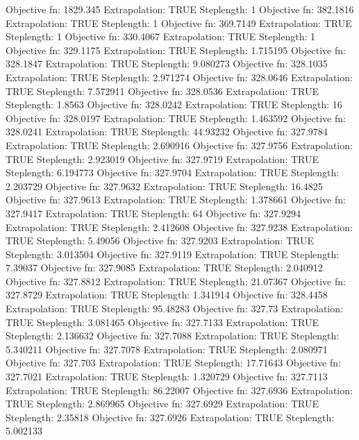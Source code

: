 \documentclass{article}
\begin{document}
\begin{Schunk}
\begin{Soutput}
Objective fn:  1829.345   Extrapolation:  TRUE   Steplength:  1 
Objective fn:  382.1816   Extrapolation:  TRUE   Steplength:  1 
Objective fn:  369.7149   Extrapolation:  TRUE   Steplength:  1 
Objective fn:  330.4067   Extrapolation:  TRUE   Steplength:  1 
Objective fn:  329.1175   Extrapolation:  TRUE   Steplength:  1.715195 
Objective fn:  328.1847   Extrapolation:  TRUE   Steplength:  9.080273 
Objective fn:  328.1035   Extrapolation:  TRUE   Steplength:  2.971274 
Objective fn:  328.0646   Extrapolation:  TRUE   Steplength:  7.572911 
Objective fn:  328.0536   Extrapolation:  TRUE   Steplength:  1.8563 
Objective fn:  328.0242   Extrapolation:  TRUE   Steplength:  16 
Objective fn:  328.0197   Extrapolation:  TRUE   Steplength:  1.463592 
Objective fn:  328.0241   Extrapolation:  TRUE   Steplength:  44.93232 
Objective fn:  327.9784   Extrapolation:  TRUE   Steplength:  2.690916 
Objective fn:  327.9756   Extrapolation:  TRUE   Steplength:  2.923019 
Objective fn:  327.9719   Extrapolation:  TRUE   Steplength:  6.194773 
Objective fn:  327.9704   Extrapolation:  TRUE   Steplength:  2.203729 
Objective fn:  327.9632   Extrapolation:  TRUE   Steplength:  16.4825 
Objective fn:  327.9613   Extrapolation:  TRUE   Steplength:  1.378661 
Objective fn:  327.9417   Extrapolation:  TRUE   Steplength:  64 
Objective fn:  327.9294   Extrapolation:  TRUE   Steplength:  2.412608 
Objective fn:  327.9238   Extrapolation:  TRUE   Steplength:  5.49056 
Objective fn:  327.9203   Extrapolation:  TRUE   Steplength:  3.013504 
Objective fn:  327.9119   Extrapolation:  TRUE   Steplength:  7.39037 
Objective fn:  327.9085   Extrapolation:  TRUE   Steplength:  2.040912 
Objective fn:  327.8812   Extrapolation:  TRUE   Steplength:  21.07367 
Objective fn:  327.8729   Extrapolation:  TRUE   Steplength:  1.341914 
Objective fn:  328.4458   Extrapolation:  TRUE   Steplength:  95.48283 
Objective fn:  327.73   Extrapolation:  TRUE   Steplength:  3.081465 
Objective fn:  327.7133   Extrapolation:  TRUE   Steplength:  2.136632 
Objective fn:  327.7088   Extrapolation:  TRUE   Steplength:  5.340211 
Objective fn:  327.7078   Extrapolation:  TRUE   Steplength:  2.080971 
Objective fn:  327.703   Extrapolation:  TRUE   Steplength:  17.71643 
Objective fn:  327.7021   Extrapolation:  TRUE   Steplength:  1.320729 
Objective fn:  327.7113   Extrapolation:  TRUE   Steplength:  86.22007 
Objective fn:  327.6936   Extrapolation:  TRUE   Steplength:  2.869965 
Objective fn:  327.6929   Extrapolation:  TRUE   Steplength:  2.35818 
Objective fn:  327.6926   Extrapolation:  TRUE   Steplength:  5.002133 

\end{Soutput}
\end{Schunk}
\end{document}

